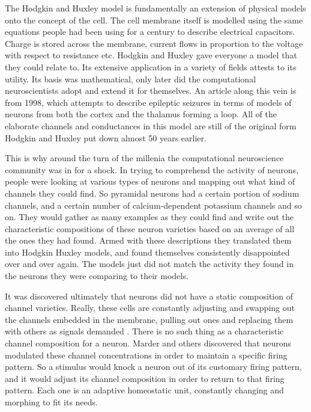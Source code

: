 \documentclass[12pt]{article}
\begin{document}
The Hodgkin and Huxley model is fundamentally an extension of physical models onto the concept of the cell.  The cell membrane itself is modelled using the same equations people had been using for a century to describe electrical capacitors.  Charge is stored across the membrane, current flows in proportion to the voltage with respect to resistance etc.  Hodgkin and Huxley gave everyone a model that they could relate to.  Its extensive application in a variety of fields attests to its utility.  Its basis was mathematical, only later did the computational neuroscientists adopt and extend it for themselves.  An article along this vein is \cite{Destexhe} from 1998, which attempts to describe epileptic seizures in terms of models of neurons from both the cortex and the thalamus forming a loop.  All of the elaborate channels and conductances in this model are still of the original form Hodgkin and Huxley put down almost 50 years earlier.

This is why around the turn of the millenia the computational neuroscience community was in for a shock.  In trying to comprehend the activity of neurons, people were looking at various types of neurons and mapping out what kind of channels they could find.  So pyramidal neurons had a certain portion of sodium channels, and a certain number of calcium-dependent potassium channels and so on.  They would gather as many examples as they could find and write out the characteristic compositions of these neuron varieties based on an average of all the ones they had found.  Armed with these descriptions they translated them into Hodgkin Huxley models, and found themselves consistently disappointed over and over again.  The models just did not match the activity they found in the neurons they were comparing to their models.  

It was discovered ultimately that neurons did not have a static composition of channel varieties.  Really, these cells are constantly adjusting and swapping out the channels embedded in the membrane, pulling out ones and replacing them with others as signals demanded \cite{Marder}.  There is no such thing as a characteristic channel composition for a neuron.  Marder and others discovered that neurons modulated these channel concentrations in order to maintain a specific firing pattern.  So a stimulus would knock a neuron out of its customary firing pattern, and it would adjust its channel composition in order to return to that firing pattern.  Each one is an adaptive homeostatic unit, constantly changing and morphing to fit its needs.
\end{document}
